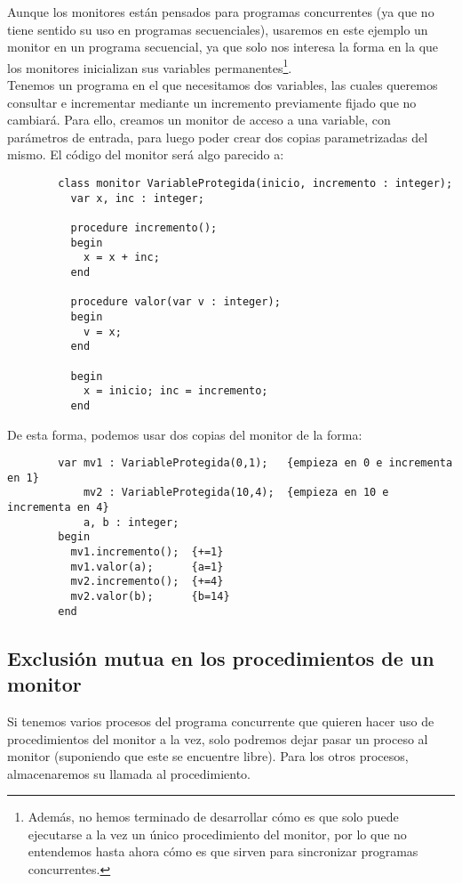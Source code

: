 \begin{ejemplo}
    Aunque los monitores están pensados para programas concurrentes (ya que no tiene sentido su uso en programas secuenciales), usaremos en este ejemplo un monitor en un programa secuencial, ya que solo nos interesa la forma en la que los monitores inicializan sus variables permanentes\footnote{Además, no hemos terminado de desarrollar cómo es que solo puede ejecutarse a la vez un único procedimiento del monitor, por lo que no entendemos hasta ahora cómo es que sirven para sincronizar programas concurrentes.}.\\

    Tenemos un programa en el que necesitamos dos variables, las cuales queremos consultar e incrementar mediante un incremento previamente fijado que no cambiará. Para ello, creamos un monitor de acceso a una variable, con parámetros de entrada, para luego poder crear dos copias parametrizadas del mismo. El código del monitor será algo parecido a:
    \begin{verbatim}
        class monitor VariableProtegida(inicio, incremento : integer);
          var x, inc : integer;

          procedure incremento();
          begin
            x = x + inc;
          end

          procedure valor(var v : integer);
          begin
            v = x;
          end
          
          begin
            x = inicio; inc = incremento;
          end
    \end{verbatim}
    De esta forma, podemos usar dos copias del monitor de la forma:
    \begin{verbatim}
        var mv1 : VariableProtegida(0,1);   {empieza en 0 e incrementa en 1}
            mv2 : VariableProtegida(10,4);  {empieza en 10 e incrementa en 4}
            a, b : integer;
        begin
          mv1.incremento();  {+=1}
          mv1.valor(a);      {a=1}
          mv2.incremento();  {+=4}
          mv2.valor(b);      {b=14}
        end
    \end{verbatim}
\end{ejemplo}

\subsection{Exclusión mutua en los procedimientos de un monitor}
Si tenemos varios procesos del programa concurrente que quieren hacer uso de procedimientos del monitor a la vez, solo podremos dejar pasar un proceso al monitor (suponiendo que este se encuentre libre). Para los otros procesos, almacenaremos su llamada al procedimiento. 

